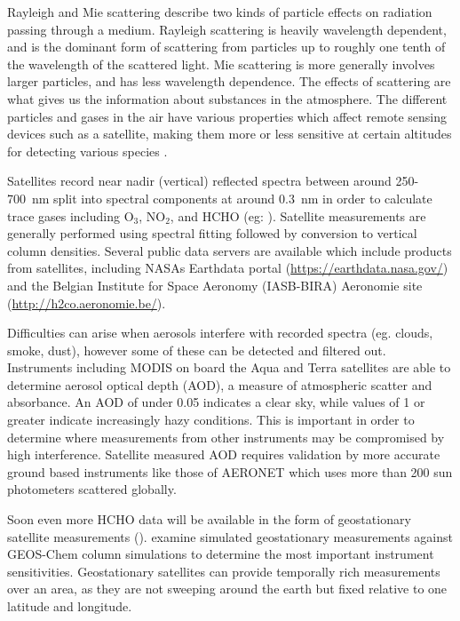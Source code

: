     Rayleigh and Mie scattering describe two kinds of particle effects on radiation passing through a medium.
    Rayleigh scattering is heavily wavelength dependent, and is the dominant form of scattering from particles up to roughly one tenth of the wavelength of the scattered light.
    Mie scattering is more generally involves larger particles, and has less wavelength dependence.
    The effects of scattering are what gives us the information about substances in the atmosphere.
    The different particles and gases in the air have various properties which affect remote sensing devices such as a satellite, making them more or less sensitive at certain altitudes for detecting various species \parencite[e.g.][]{Martin2002}.
    
    Satellites record near nadir (vertical) reflected spectra between around 250-700~nm split into spectral components at around $0.3$~nm in order to calculate trace gases including O$_3$, NO$_2$, and HCHO (eg: \textcite{Leue2001}).
    Satellite measurements are generally performed using spectral fitting followed by conversion to vertical column densities.
    Several public data servers are available which include products from satellites, including NASAs Earthdata portal (\url{https://earthdata.nasa.gov/}) and the Belgian Institute for Space Aeronomy (IASB-BIRA) Aeronomie site (\url{http://h2co.aeronomie.be/}).
    
    
    Difficulties can arise when aerosols interfere with recorded spectra (eg. clouds, smoke, dust), however some of these can be detected and filtered out.
    Instruments including MODIS on board the Aqua and Terra satellites are able to determine aerosol optical depth (AOD), a measure of atmospheric scatter and absorbance. 
    An AOD of under 0.05 indicates a clear sky, while values of 1 or greater indicate increasingly hazy conditions.
    This is important in order to determine where measurements from other instruments may be compromised by high interference.
    Satellite measured AOD requires validation by more accurate ground based instruments like those of AERONET which uses more than 200 sun photometers scattered globally.
    
    Soon even more HCHO data will be available in the form of geostationary satellite measurements (\textcite{Kwon2017}).
    \textcite{Kwon2017} examine simulated geostationary measurements against GEOS-Chem column simulations to determine the most important instrument sensitivities.
    Geostationary satellites can provide temporally rich measurements over an area, as they are not sweeping around the earth but fixed relative to one latitude and longitude.
    
